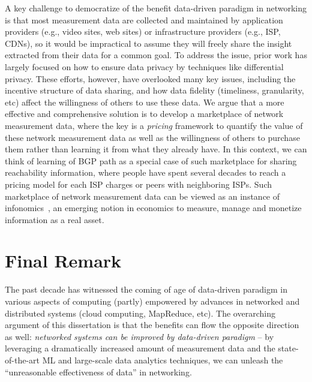 A key challenge to democratize of the benefit 
data-driven paradigm in networking is that most measurement 
data are collected 
and maintained by application providers (e.g., video sites, 
web sites) or infrastructure providers (e.g., ISP, CDNs), so 
it would be impractical to assume they will freely share 
the insight extracted from their data for a common goal.
To address the issue, prior work has largely focused on how to ensure data privacy
by techniques like differential privacy. 
These efforts, however, have overlooked many key issues, including the 
incentive structure of data sharing, and how data fidelity (timeliness, 
granularity, etc) affect the willingness of others to use these data.
We argue that a more effective and comprehensive solution is to
develop a marketplace of network measurement data, where the key
is a {\em pricing} framework to quantify the value of these 
network measurement data as well as the willingness of others to 
purchase them rather than learning it from what they already have.
In this context, we can think of learning of BGP path as a special case of 
such marketplace 
for sharing reachability information, where people have spent several decades
to reach a pricing model for each ISP charges or peers with 
neighboring ISPs.
Such marketplace of network measurement data can be viewed
as an instance of infonomics~\cite{infonomics}, an emerging notion in economics
to measure, manage and monetize information as a real asset.


\section{Final Remark}

The past decade has witnessed the coming of age of data-driven
paradigm in various aspects of computing (partly) empowered by advances
in networked and distributed systems (cloud computing, MapReduce, etc).
The overarching argument of this dissertation is that the benefits 
can flow the opposite direction as well:
{\em networked systems can be improved
by data-driven paradigm} -- 
by leveraging a dramatically increased amount of measurement data
and the state-of-the-art ML and large-scale data analytics techniques,
we can unleash the ``unreasonable effectiveness of data'' 
in networking.

